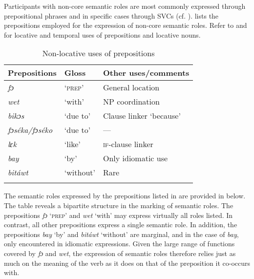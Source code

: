 Participants with non-core semantic roles are most commonly expressed through prepositional phrases and in specific cases through SVCs (cf. ).  lists the prepositions employed for the expression of non-core semantic roles. Refer to  and  for locative and temporal uses of prepositions and locative nouns.

\begin{table}
\caption{Non-locative uses of prepositions}
\label{tab:key:9.1}

\begin{tabularx}{\textwidth}{XXX}
\lsptoprule

Prepositions & Gloss & Other uses/comments\\
\midrule
\itshape fɔ & ‘\textsc{prep}’ & General location\\
\itshape wet & ‘with’ & NP coordination\\
\itshape bikɔs & ‘due to’ & Clause linker ‘because’\\
\itshape fɔséka/fɔséko & ‘due to’ & —\\
\itshape lɛk & ‘like’ & \textsc{if-}clause linker \\
\itshape bay & ‘by’ & Only idiomatic use\\
\itshape bitáwt & ‘without’ & Rare\\
\lspbottomrule
\end{tabularx}
\end{table}


The semantic roles expressed by the prepositions listed in  are provided in  below. The table reveals a bipartite structure in the marking of semantic roles. The prepositions \textit{fɔ} ‘\textsc{prep}’ and \textit{wet} ‘with’ may express virtually all roles listed. In contrast, all other prepositions express a single semantic role. In addition, the prepositions \textit{bay} ‘by’ and \textit{bitáwt} ‘without’ are marginal, and in the case of \textit{bay}, only encountered in idiomatic expressions. Given the large range of functions covered by \textit{fɔ} and \textit{wet}, the expression of semantic roles therefore relies just as much on the meaning of the verb as it does on that of the preposition it co-occurs with.

